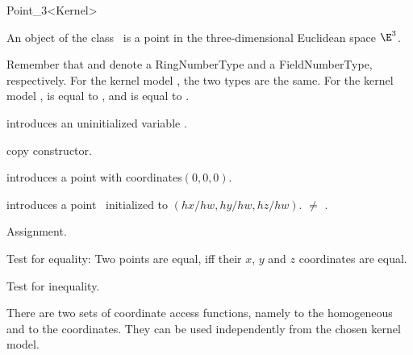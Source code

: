 \begin{ccRefClass} {Point_3<Kernel>}

\ccDefinition
An object of the class \ccRefName\ is a point in the three-dimensional
Euclidean space $\E^3$. 

Remember that  and  denote a
RingNumberType and a FieldNumberType, respectively. For the kernel
model , the two types are the same. For the
kernel model ,  is equal
to , and  is equal to
.

\ccTypes
{}
\ccThreeToTwo


\ccCreation
{}


\ccHidden {}
             {introduces an uninitialized variable \ccVar.}

\ccHidden {}
            {copy constructor.}

            {introduces a point with  coordinates$(0,0,0)$.}

            {introduces a point \ccVar\ initialized to $(hx/hw,hy/hw, hz/hw)$.
             \ccPrecond {} $\neq$ .}


\ccOperations

\ccHidden {}
        {Assignment.}

       {Test for equality: Two points are equal, iff their $x$, $y$ and $z$
        coordinates are equal.}

       {Test for inequality.}

There are two sets of coordinate access functions, namely to the
homogeneous and to the  coordinates. They can be used
independently from the chosen kernel model.


\end{ccRefClass}
